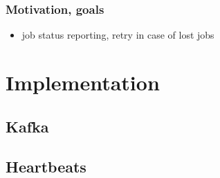 \subsubsection{Motivation, goals}

\begin{itemize}
	\item job status reporting, retry in case of lost jobs
\end{itemize}

\section{Implementation}

\subsection{Kafka}

\subsection{Heartbeats}
